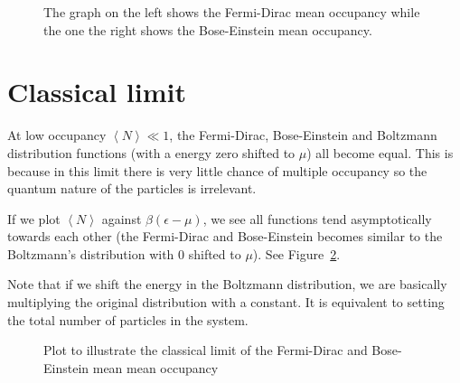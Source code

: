 \documentclass[12pt,chapterprefix=false,dvipsnames]{scrbook}
\theoremstyle{dotless}
\theoremstyle{definition}
\begin{document}
\begin{figure}[htpb]
	\centering
	
	\caption{The graph on the left shows the Fermi-Dirac mean occupancy while
		the one the right shows the Bose-Einstein mean occupancy.}%
	\label{fig:mean_occupancy}
\end{figure}

\section{Classical limit}%
\label{sec:classical_limit}

At low occupancy $\left<N\right> \ll 1$, the Fermi-Dirac,
Bose-Einstein and Boltzmann distribution functions (with a
energy zero shifted to $\mu$) all become
equal. This is because in this limit there is very little chance
of multiple occupancy so the quantum nature of the particles is
irrelevant.

If we plot $\left<N\right>$ against
$\beta\left(\epsilon - \mu\right)$, we see all functions tend
asymptotically towards each other (the Fermi-Dirac and
Bose-Einstein becomes similar to the Boltzmann's distribution
with 0 shifted to $\mu$). See
Figure~\ref{fig:classical_limit}.

Note that if we shift the energy in the Boltzmann distribution,
we are basically multiplying the original distribution with a
constant. It is equivalent to setting the total number of
particles in the system.

\begin{figure}[htpb]
	\centering
	
	\caption{Plot to illustrate the classical limit of the Fermi-Dirac and
		Bose-Einstein mean mean occupancy}%
	\label{fig:classical_limit}
\end{figure}
\end{document}
